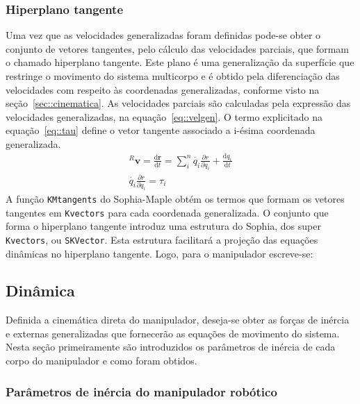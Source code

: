 \subsubsection{Hiperplano tangente}

Uma vez que as velocidades generalizadas foram definidas pode-se obter o
conjunto de vetores tangentes, pelo cálculo das velocidades parciais, que formam
o chamado hiperplano tangente.
Este plano é uma generalização da superfície que restringe o movimento do
sistema multicorpo e é obtido pela diferenciação das velocidades com respeito
às coordenadas generalizadas, conforme visto na seção~\ref{sec::cinematica}. As
velocidades parciais são calculadas pela expressão das velocidades
generalizadas, na equação~\ref{eq::velgen}. O termo explicitado na
equação~\ref{eq::tau} define o vetor tangente associado a i-ésima coordenada
generalizada.
%
\begin{gather}
	^{R}\mathbf{v} = \frac{\mathrm{d} \mathbf{r}}{\mathrm{d} t} = \sum_{i}^{n}
	\dot{q_{i}} \frac{\partial r}{\partial q_{i}} + \frac{\mathrm{d}
	q_{i}}{\mathrm{d} t} \label{eq::velgen}\\
	\dot{q_{i}} \frac{\partial r}{\partial q_{i}} = \tau_{i} \label{eq::tau}
\end{gather}
%
A função \texttt{KMtangents} do Sophia-Maple obtém os termos que formam os
vetores tangentes em \texttt{Kvectors} para cada coordenada generalizada. O
conjunto que forma o hiperplano tangente introduz uma estrutura do Sophia, dos
super \texttt{Kvectors}, ou \texttt{SKVector}. Esta estrutura facilitará a
projeção das equações dinâmicas no hiperplano tangente. Logo, para o manipulador
escreve-se:

\bigskip {} \bigskip 


\subsection{Dinâmica}

Definida a cinemática direta do manipulador, deseja-se obter as forças de
inércia e externas generalizadas que fornecerão as equações de movimento do
sistema. Nesta seção primeiramente são introduzidos os parâmetros de inércia de
cada corpo do manipulador e como foram obtidos.

\subsubsection{Parâmetros de inércia do manipulador robótico}

